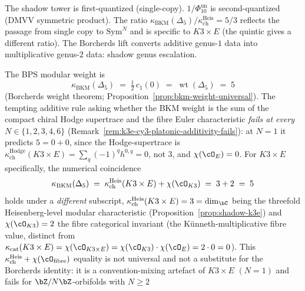 \begin{remark}
\label{rem:second-quantization-gap}
The shadow tower is first-quantized (single-copy).
\(1/\Phi_{10}^{\mathrm{un}}\) is second-quantized (DMVV symmetric product).
The ratio $\kappa_{\mathrm{BKM}}(\Delta_5)/\kappa_{\mathrm{ch}}^{\mathrm{Heis}} = 5/3$
reflects the passage from single copy to $\mathrm{Sym}^N$
and is specific to $K3 \times E$ (the quintic gives a different
ratio). The Borcherds lift converts additive genus-$1$ data
into multiplicative genus-$2$ data: shadow genus escalation.
\end{remark}

\begin{proposition}
\label{prop:kappa-bps-decomposition}
The BPS modular weight is
\begin{equation}\label{eq:kappa-bps-decomposition}
\kappa_{\mathrm{BKM}}(\Delta_5)
\;=\; \tfrac{1}{2}\,c_1(0)
\;=\; \operatorname{wt}(\Delta_5)
\;=\; 5
\end{equation}
\textup{(}Borcherds weight theorem;
Proposition~\textup{\ref{prop:bkm-weight-universal})}.
The tempting additive rule asking whether the BKM weight is the sum of the compact chiral Hodge supertrace and the fibre Euler characteristic \emph{fails at every} $N \in \{1, 2, 3, 4, 6\}$ (Remark~\ref{rem:k3e-cy3-platonic-additivity-fails}): at $N = 1$ it predicts $5 = 0 + 0$, since the Hodge-supertrace is $\kappa_{\mathrm{ch}}^{\mathrm{Hodge}}(K3 \times E) = \sum_q (-1)^q h^{0,q} = 0$, not $3$, and $\chi(\cO_E)=0$. For $K3 \times E$ specifically, the numerical coincidence
\[
\kappa_{\mathrm{BKM}}(\Delta_5)
\;=\; \kappa_{\mathrm{ch}}^{\mathrm{Heis}}(K3 \times E) + \chi(\cO_{K3})
\;=\; 3 + 2
\;=\; 5
\]
holds under a \emph{different} subscript, $\kappa_{\mathrm{ch}}^{\mathrm{Heis}}(K3 \times E) = 3 = \dim_\bC$ being the threefold Heisenberg-level modular characteristic
\textup{(}Proposition~\textup{\ref{prop:shadow-k3e})}
and $\chi(\cO_{K3}) = 2$ the fibre categorical invariant
\textup{(}the K\"unneth-multiplicative fibre value, distinct
from $\kappa_{\mathrm{cat}}(K3 \times E) = \chi(\cO_{K3 \times E})
= \chi(\cO_{K3}) \cdot \chi(\cO_E) = 2 \cdot 0 = 0$\textup{)}.
This $\kappa_{\mathrm{ch}}^{\mathrm{Heis}} + \chi(\cO_{\mathrm{fibre}})$ equality is not universal and not a substitute for the Borcherds identity: it is a convention-mixing artefact of $K3 \times E$ $(N = 1)$ and fails for $\bZ/N\bZ$-orbifolds with $N \geq 2$

\end{proposition}
